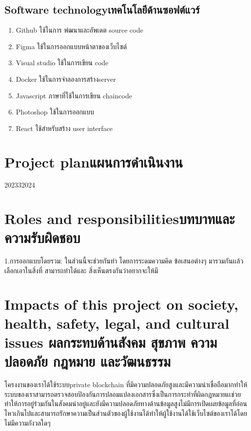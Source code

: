 \subsection{\ifenglish Software technology\else เทคโนโลยีด้านซอฟต์แวร์\fi}
\begin{enumerate}
    \item Github ใช้ในการ พํฒนาและอัพเดต source code 
    \item Figma  ใช้ในการออกแบบหน้าตาของเว็บไซต์
    \item Visual studio ใช้ในการเขียน code
    \item Docker ใช้ในการจำลองการสร้างserver 
    \item Javascript ภาษาที่ใช้ในการเขียน chaincode 
    \item Photoshop ใช้ในการออกแบบ
    \item React ใช้สำหรับสร้าง user interface
\end{enumerate}
\section{\ifenglish Project plan\else แผนการดำเนินงาน\fi}

\begin{plan}{10}{2023}{3}{2024}
\end{plan}

\section{\ifenglish Roles and responsibilities\else บทบาทและความรับผิดชอบ\fi}


1.การออกแบบโดยรวม: ในส่วนนี้จะช่วยกันทำ โดยการระดมความคิด ข้อเสนอต่างๆ มารวมกันเเล้วเลือกเอาในสิ่งที่ สามารถทำได้และ สิ่งเห็นตรงกันว่าอยากจะให้มี

\section{\ifenglish%
Impacts of this project on society, health, safety, legal, and cultural issues
\else%
ผลกระทบด้านสังคม สุขภาพ ความปลอดภัย กฎหมาย และวัฒนธรรม
\fi}
\enskip \enskip \enskip \enskip \enskip 
โครงงานของเราได้ใช้ระบบprivate blockchain ที่มีความปลอดภัยสูงและมีความน่าเชื่อถือมากทำให้ระบบของเราสามารถตรวจสอบป้องกันการปลอมแปลงเอกสารซึ่งเป็นการกระทำที่ผิดกฎหมายแเช่วยทำให้การอยู่ร่วมกันในสังคมน่าอยู่และยังมีความปลอดภัยทางด้านข้อมูลสูงไม่มีการเปิดเผยข้อมูลที่อ่อนไหวเกินไปและสามารถรักษาความเป็นส่วนตัวของผู้ใช้งานได้ทำให้ผู้ใช้งานได้ใช้เว็บไซต์ของเราได้โดยไม่มีความกังวลใดๆ





